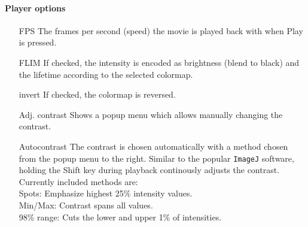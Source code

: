 \documentclass[11pt,onside]{report}
\numberwithin{equation}{chapter}
\begin{document}
\paragraph{Player options}
\begin{itemize}[leftmargin=3cm]
\item[\textsf{FPS}] The frames per second (speed) the movie is played back with when \textsf{Play} is pressed.
\item[\textsf{FLIM}] If checked, the intensity is encoded as brightness (blend to black) and the lifetime according to the selected colormap.
\item[\textsf{invert}] If checked, the colormap is reversed.
\item[\textsf{Adj. contrast}] Shows a popup menu which allows manually changing the contrast.
\item[\textsf{Autocontrast}] The contrast is chosen automatically with a method chosen from the popup menu to the right. Similar to the popular \texttt{ImageJ} software, holding the \textsf{Shift} key during playback continously adjusts the contrast. 
	Currently included methods are: \\\hspace*{0.35cm}
	Spots: Emphasize highest 25\% intensity values.\\\hspace*{0.35cm}
	Min/Max: Contrast spans all values.\\\hspace*{0.35cm}
	98\% range: Cuts the lower and upper 1\% of intensities. 


\end{itemize}
\end{document}
